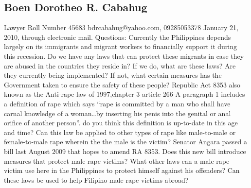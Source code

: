 

	\subsection{Boen Dorotheo R. Cabahug}	
	\begin{outline}
		\1 Lawyer 
		\1Roll Number 45683
		\1 bdrcabahug@yahoo.com, 09285053378
		\1 January 21, 2010, through electronic mail.
		\1 Questions:
			\2 Currently the Philippines depends largely on its immigrants and migrant workers  to financially support it during this recession. Do we have any laws that can protect these migrants in case they are abused in the countries they reside in?
			\3 If we do, what are these laws? Are they currently being implemented?
			\3 If not, what certain measures has the Government taken to ensure the safety of these people?
			\2 Republic Act 8353 also known as the Anti-rape law of 1997,chapter 3 article 266-A paragraph 1 includes a definition of rape which says ``rape is committed by a man who shall have carnal knowledge of a woman\ldots by inserting his penis into the genital or anal orifice of another person''. do you think this definition is up-to-date in this age and time?
			\3 Can this law be applied to other types of rape like male-to-male or female-to-male rape wherein the the male is the victim?
			\3 Senator Angara passed a bill last August 2009 that hopes to amend RA 8353. Does this new bill introduce measures that protect male rape victims?
			\2 What other laws can a male rape victim use here in the Philippines to protect himself against his offenders?
			\3 Can these laws be used to help Filipino male rape victims abroad?
	\end{outline}
